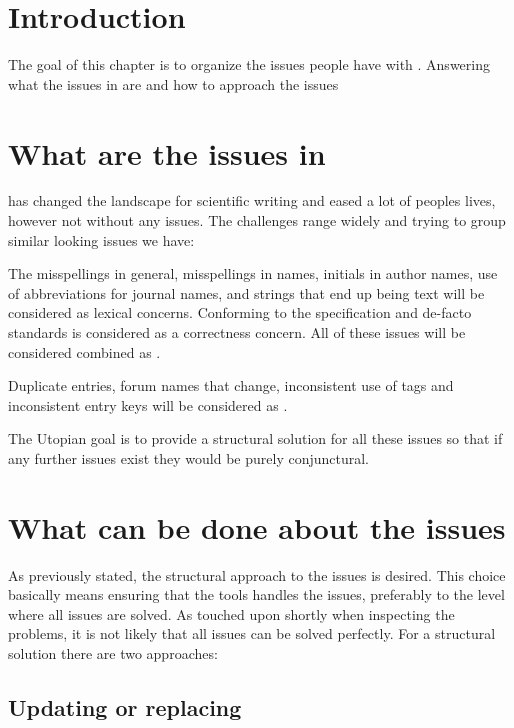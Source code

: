 \section{Introduction}
The goal of this chapter is to organize the issues people have with
{\bibtex}.  Answering what the issues in {\bibtex} are
 and how to approach the {\bibtex}
issues 

\section{What are the issues in {\bibtex}}
\label{sec:intro_what_issues}

{\bibtex} has changed the landscape for scientific writing and eased a
lot of peoples lives, however not without any issues.  The challenges
range widely and trying to group similar looking issues we have:

The misspellings in general, misspellings in names, initials in author
names, use of abbreviations for journal names, and {\bibtex} strings
that end up being text will be considered as lexical concerns.
Conforming to the specification and de-facto standards is considered
as a correctness concern.  All of these issues will be considered
combined as .

Duplicate entries, forum names that change, inconsistent use of tags
and inconsistent entry keys will be considered as .

The Utopian goal is to provide a structural solution for all these
issues so that if any further issues exist they would be purely
conjunctural.


\section{What can be done about the {\bibtex} issues}
\label{sec:intro_what_to_do}

As previously stated, the structural approach to the issues is desired.
This choice basically means ensuring that the tools handles the
issues, preferably to the level where all issues are solved.  As
touched upon shortly when inspecting the problems, it is not likely
that all issues can be solved perfectly.  For a structural solution
there are two approaches:


\subsection{Updating or replacing {\bibtex}}

